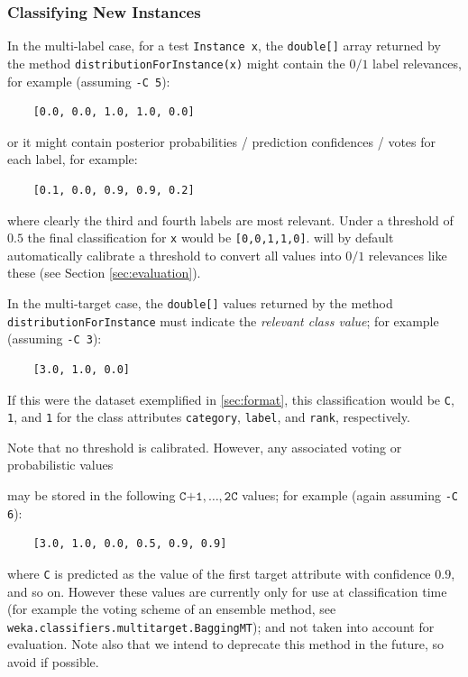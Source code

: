 \documentclass[11pt]{article}
\newcommand{\MEKA}{Meka}
\begin{document}
\subsubsection{Classifying New Instances}

In the multi-label case, for a test \texttt{Instance x}, the \texttt{double[]} array returned by the method \texttt{distributionForInstance(x)} might contain the $0/1$ label relevances, for example (assuming \texttt{-C 5}):
\begin{lstlisting}
	[0.0, 0.0, 1.0, 1.0, 0.0]
\end{lstlisting} 
or it might contain posterior probabilities / prediction confidences / votes for each label, for example:
\begin{lstlisting}
	[0.1, 0.0, 0.9, 0.9, 0.2]
\end{lstlisting} 
where clearly the third and fourth labels are most relevant. Under a threshold of $0.5$ the final classification for \texttt{x} would be \texttt{[0,0,1,1,0]}. \framework{\MEKA} will by default automatically calibrate a threshold to convert all values into $0/1$ relevances like these (see Section \ref{sec:evaluation}). 


In the multi-target case, the \texttt{double[]} values returned by the method \texttt{distributionForInstance} must indicate the \emph{relevant class value}; for example (assuming \texttt{-C 3}): 
\begin{lstlisting}
	[3.0, 1.0, 0.0]
\end{lstlisting} 
If this were the dataset exemplified in \ref{sec:format}, this classification would be \texttt{C}, \texttt{1}, and \texttt{1} for the class attributes \texttt{category}, \texttt{label}, and \texttt{rank}, respectively.

Note that no threshold is calibrated. However, any associated voting or probabilistic values {\green may be stored in the following $\texttt{C+1},\ldots,\texttt{2C}$ values; for example (again assuming \texttt{-C 6}):
\begin{lstlisting}
	[3.0, 1.0, 0.0, 0.5, 0.9, 0.9]
\end{lstlisting} 
where \texttt{C} is predicted as the value of the first target attribute with confidence $0.9$, and so on. However these values are currently only for use at classification time (for example the voting scheme of an ensemble method, see \texttt{weka.classifiers.multitarget.BaggingMT}); and not taken into account for evaluation. Note also that we intend to deprecate this method in the future, so avoid if possible.
}
\end{document}
